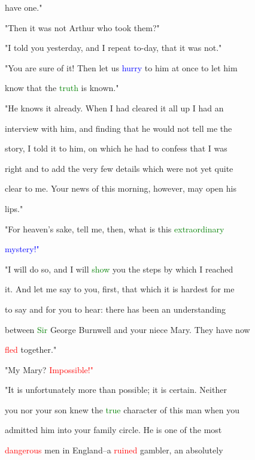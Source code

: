  have one."



 "Then it was not Arthur who took them?"



 "I told you yesterday, and I repeat to-day, that it was not."



 "You are sure of it! Then let us \textcolor{blue}{hurry} to him at once to let him

 know that the \textcolor{green}{truth} is known."



 "He knows it already. When I had cleared it all up I had an

 interview with him, and finding that he would not tell me the

 story, I told it to him, on which he had to \textcolor{BurntOrange}{confess} that I was

 right and to add the very few details which were not yet quite

 clear to me. Your news of this morning, however, may open his

 lips."



 "For heaven's sake, tell me, then, what is this \textcolor{green}{extraordinary}

 \textcolor{blue}{mystery!"}



 "I will do so, and I will \textcolor{green}{show} you the steps by which I reached

 it. And let me say to you, first, that which it is hardest for me

 to say and for you to hear: there has been an understanding

 between \textcolor{green}{Sir} George Burnwell and your niece Mary. They have now

 \textcolor{red}{fled} together."



 "My Mary? \textcolor{red}{Impossible!"}



 "It is unfortunately more than possible; it is certain. Neither

 you nor your son knew the \textcolor{green}{true} character of this man when you

 admitted him into your family circle. He is one of the most

 \textcolor{red}{dangerous} men in England--a \textcolor{red}{ruined} \textcolor{BurntOrange}{gambler,} an absolutely

